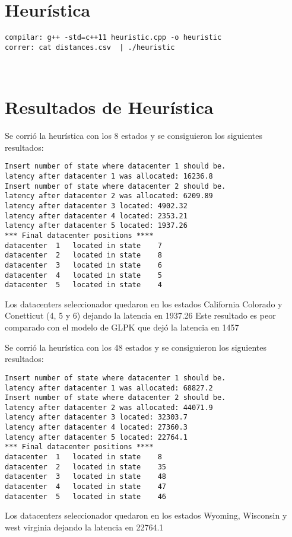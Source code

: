 \documentclass{article}
\begin{document}
\part{Heur\'istica}
\begin{verbatim}
compilar: g++ -std=c++11 heuristic.cpp -o heuristic
correr: cat distances.csv  | ./heuristic
\end{verbatim}

\






\newpage
\part{Resultados de Heur\'istica}

Se corri\'o la heur\'istica con los 8 estados y se consiguieron los siguientes resultados:
\begin{verbatim}
Insert number of state where datacenter 1 should be.
latency after datacenter 1 was allocated: 16236.8
Insert number of state where datacenter 2 should be.
latency after datacenter 2 was allocated: 6209.89
latency after datacenter 3 located: 4902.32
latency after datacenter 4 located: 2353.21
latency after datacenter 5 located: 1937.26
*** Final datacenter positions ****
datacenter	1	located in state	7
datacenter	2	located in state	8
datacenter	3	located in state	6
datacenter	4	located in state	5
datacenter	5	located in state	4
\end{verbatim}

\smallskip
Los datacenters seleccionador quedaron en los estados California Colorado y Conetticut (4, 5 y 6) dejando la latencia en 1937.26
\smallskip
Este resultado es peor comparado con el modelo de GLPK que dej\'o la latencia en 1457
\bigskip


Se corri\'o la heur\'istica con los 48 estados y se consiguieron los siguientes resultados:
\begin{verbatim}
Insert number of state where datacenter 1 should be.
latency after datacenter 1 was allocated: 68827.2
Insert number of state where datacenter 2 should be.
latency after datacenter 2 was allocated: 44071.9
latency after datacenter 3 located: 32303.7
latency after datacenter 4 located: 27360.3
latency after datacenter 5 located: 22764.1
*** Final datacenter positions ****
datacenter	1	located in state	8
datacenter	2	located in state	35
datacenter	3	located in state	48
datacenter	4	located in state	47
datacenter	5	located in state	46

\end{verbatim}
\smallskip
Los datacenters seleccionador quedaron en los estados Wyoming, Wisconsin y west virginia dejando la latencia en 22764.1
\end{document}
